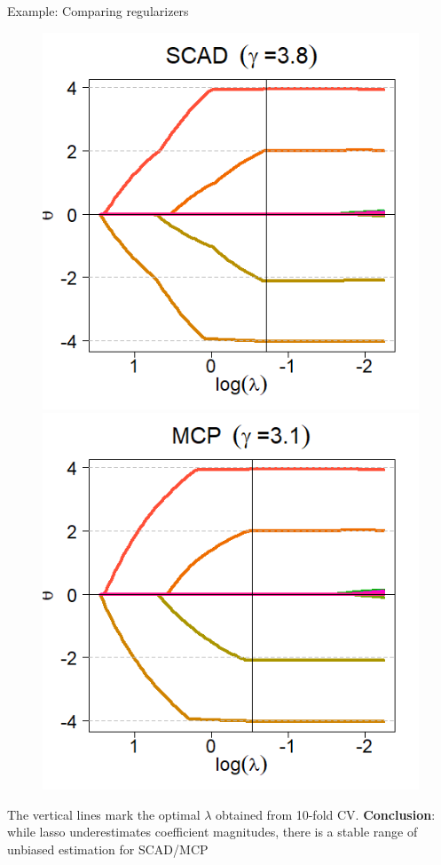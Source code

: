 \documentclass[11pt,compress,t,notes=noshow, xcolor=table]{beamer}
\begin{document}
\begin{vbframe}{Example: Comparing regularizers}
\begin{figure}[h]
\begin{minipage}{0.32\linewidth}
      \centerline{\includegraphics[width=\textwidth]{figure_man/other-pen-SCAD.png}}
    \end{minipage}
    \begin{minipage}{0.32\linewidth}
      \vspace{3pt}
      \centerline{\includegraphics[width=\textwidth]{figure_man/other-pen-MCP.png}}
    \end{minipage}
  \end{figure}
The vertical lines mark the optimal $\lambda$ obtained from 10-fold CV.
\textbf{Conclusion}: while lasso underestimates coefficient magnitudes, there is a stable range of unbiased estimation for SCAD/MCP

\end{vbframe}
\end{document}
